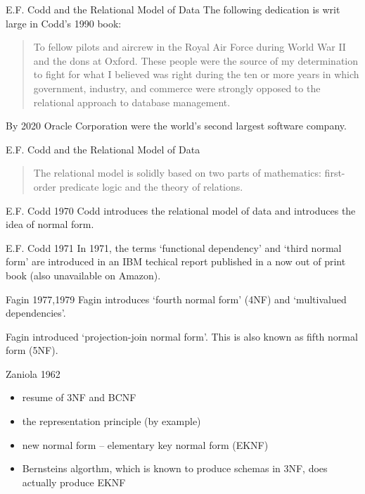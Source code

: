 


\begin{frame}{E.F. Codd and the Relational Model of Data}
The following dedication is writ large in Codd's 1990 book:
\begin{quote}
To fellow pilots and aircrew
in the Royal Air Force
during World War II
and the dons at Oxford.
These people were the source of my determination to
fight for what I believed was right during the ten or
more years in which government, industry, and
commerce were strongly opposed to the relational
approach to database management.
\end{quote}
By 2020 Oracle Corporation were the world's second largest software company.
\end{frame}
\begin{frame}{E.F. Codd and the Relational Model of Data}
\begin{quote}
The relational model is solidly based on two parts of mathematics: first-
order predicate logic and the theory of relations.
\end{quote} 
\end{frame}

\begin{frame}{E.F. Codd 1970}
Codd introduces the relational model of data and introduces the idea of normal form.
\end{frame}

\begin{frame}{E.F. Codd 1971}
In 1971, the terms `functional dependency' and  `third normal form' are introduced 
in an IBM techical report published in a now out of print book (also unavailable on Amazon).
\end{frame}

\begin{frame}{Fagin 1977,1979}
Fagin introduces `fourth normal form' (4NF) and `multivalued dependencies'.

Fagin introduced `projection-join normal form'. This is also known as fifth normal form (5NF).
\end{frame}

\begin{frame}{Zaniola 1962}
\begin{itemize}
\item resume of 3NF and BCNF
\item the representation principle (by example)
\item new normal form -- elementary key normal form (EKNF)
\item Bernsteins algorthm, which is known to produce schemas in 3NF, does actually produce EKNF
\end{itemize}
\end{frame}

